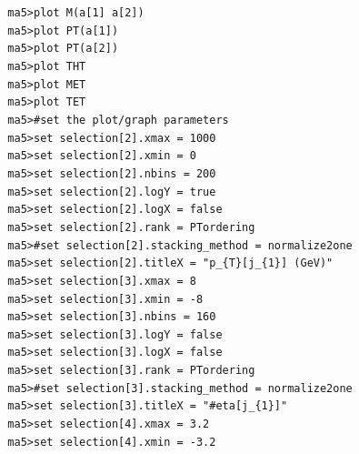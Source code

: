 \documentclass[a4paper, 10pt]{article}
\begin{document}
\texttt{ }\texttt{ }\texttt{ma5>plot M(a[1] a[2])\\
}
\texttt{ }\texttt{ }\texttt{ma5>plot PT(a[1])\\
}
\texttt{ }\texttt{ }\texttt{ma5>plot PT(a[2])\\
}
\texttt{ }\texttt{ }\texttt{ma5>plot THT\\
}
\texttt{ }\texttt{ }\texttt{ma5>plot MET\\
}
\texttt{ }\texttt{ }\texttt{ma5>plot TET\\
}
\texttt{ }\texttt{ }\texttt{ma5>\#set the plot/\-graph parameters\\
}
\texttt{ }\texttt{ }\texttt{ma5>set selection[2].xmax = 1000\\
}
\texttt{ }\texttt{ }\texttt{ma5>set selection[2].xmin = 0\\
}
\texttt{ }\texttt{ }\texttt{ma5>set selection[2].nbins = 200\\
}
\texttt{ }\texttt{ }\texttt{ma5>set selection[2].logY = true\\
}
\texttt{ }\texttt{ }\texttt{ma5>set selection[2].logX = false\\
}
\texttt{ }\texttt{ }\texttt{ma5>set selection[2].rank = PTordering\\
}
\texttt{ }\texttt{ }\texttt{ma5>\#set selection[2].stacking\_method = normalize2one\\
}
\texttt{ }\texttt{ }\texttt{ma5>set selection[2].titleX = "p\_\{T\}[j\_\{1\}] (GeV)"\\
}
\texttt{ }\texttt{ }\texttt{ma5>set selection[3].xmax = 8\\
}
\texttt{ }\texttt{ }\texttt{ma5>set selection[3].xmin = -8\\
}
\texttt{ }\texttt{ }\texttt{ma5>set selection[3].nbins = 160\\
}
\texttt{ }\texttt{ }\texttt{ma5>set selection[3].logY = false\\
}
\texttt{ }\texttt{ }\texttt{ma5>set selection[3].logX = false\\
}
\texttt{ }\texttt{ }\texttt{ma5>set selection[3].rank = PTordering\\
}
\texttt{ }\texttt{ }\texttt{ma5>\#set selection[3].stacking\_method = normalize2one\\
}
\texttt{ }\texttt{ }\texttt{ma5>set selection[3].titleX = "\#eta[j\_\{1\}]"\\
}
\texttt{ }\texttt{ }\texttt{ma5>set selection[4].xmax = 3.2\\
}
\texttt{ }\texttt{ }\texttt{ma5>set selection[4].xmin = -3.2\\
}
\end{document}
